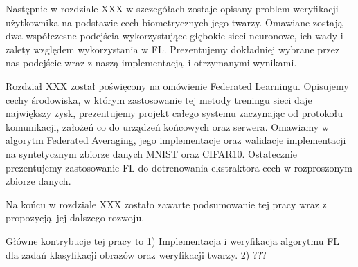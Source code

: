 Następnie w rozdziale XXX w szczegółach zostaje opisany problem weryfikacji użytkownika na podstawie cech biometrycznych jego twarzy. Omawiane zostają dwa współczesne podejścia wykorzystujące głębokie sieci neuronowe, ich wady i zalety względem wykorzystania w FL. Prezentujemy dokładniej wybrane przez nas podejście wraz z naszą implementacją i otrzymanymi wynikami.

Rozdział XXX został poświęcony na omówienie Federated Learningu. Opisujemy cechy środowiska, w którym zastosowanie tej metody treningu sieci daje największy zysk, prezentujemy projekt całego systemu zaczynając od protokołu komunikacji, założeń co do urządzeń końcowych oraz serwera. Omawiamy w algorytm Federated Averaging, jego implementacje oraz walidacje implementacji na syntetycznym zbiorze danych MNIST oraz CIFAR10. Ostatecznie prezentujemy zastosowanie FL do dotrenowania ekstraktora cech w rozproszonym zbiorze danych.

Na końcu w rozdziale XXX zostało zawarte podsumowanie tej pracy wraz z propozycją jej dalszego rozwoju.  


Główne kontrybucje tej pracy to 1) Implementacja i weryfikacja algorytmu  FL dla zadań klasyfikacji obrazów oraz weryfikacji twarzy. 2) ???
